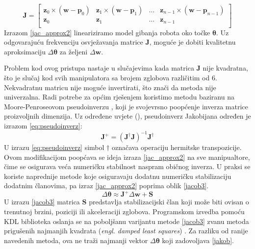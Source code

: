 \documentclass[times, utf8, diplomski, numeric]{fer}
\begin{document}
\begin{equation}
\mathbf{J} =
\begin{bmatrix}
\mathbf{z}_{0} \times (\mathbf{w} - \mathbf{p}_{0}) &\mathbf{z}_{1} \times (\mathbf{w} - \mathbf{p}_{1}) &\ldots &\mathbf{z}_{n-1} \times (\mathbf{w} - \mathbf{p}_{n-1})\\
\textbf{z}_{0} &\textbf{z}_{1} &\ldots &\textbf{z}_{n-1}\\
\end{bmatrix}
\label{jacob2}
\end{equation}
Izrazom \ref{jac_approx2} lineariziramo model gibanja robota oko točke $\bm{\theta}$. 
Uz odgovarajuću frekvenciju osvježavanja matrice $\mathbf{J}$, moguće je dobiti kvalitetnu aproksimaciju $\Delta \bm{\theta}$ za željeni $\Delta \mathbf{w}$.

Problem kod ovog pristupa nastaje u slučajevima kada matrica $\mathbf{J}$ nije kvadratna, što je slučaj kod svih manipulatora sa brojem zglobova različitim od 6.
Nekvadratnu matricu nije moguće invertirati, što znači da metoda nije univerzalna.
Radi potrebe za općim rješenjem koristimo metodu baziranu na Moore-Penroseovom pseudoinverzu \cite{klein1983review}, koji je svojevrsno poopćenje inverza matrice proizvoljnih dimenzija.
Uz određene uvjete (\cite{ben2003generalized}), pseudoinverz Jakobijana određen je izrazom \ref{eq:pseudoinverz}:
\begin{equation}
\mathbf{J}^{+} = \left( \mathbf{J}^{\dagger} \mathbf{J}\right)^{-1}\mathbf{J}^{\dagger}
\label{eq:pseudoinverz}
\end{equation}
U izrazu \ref{eq:pseudoinverz} simbol $\dagger$ označava operaciju hermitske transpozicije.
Ovom modifikacijom poopćava se ideja izraza \ref{jac_approx2} na sve manipualtore, čime se osigurava veća numeričku stabilnost naspram običnog inverza.
U praksi se koriste naprednije metode koje osiguravaju dodatnu numeričku stabilizaciju dodatnim članovima, pa izraz \ref{jac_approx2} poprima oblik \ref{jacob3}.
\begin{equation}
\Delta \bm{\theta} \approx \mathbf{J}^{+} \Delta \textbf{w} + \mathbf{S}
\label{jacob3}
\end{equation}
U izrazu \ref{jacob3} matrica $\mathbf{S}$ predstavlja stabilizacijski član koji može biti ovisan o trenutnoj brzini, poziciji ili akceleraciji zglobova.
Programskom izvedba pomoću KDL biblioteka oslanja se na poboljšanu varijantu metode \ref{jacob3} zvanu metoda prigušenih najmanjih kvadrata (\textit{engl. damped least squares}) \cite{buss2005selectively}.
Za razliku od ranije navedenih metoda, ova ne traži najmanji vektor $\Delta \bm{\theta}$ koji zadovoljava \ref{jakob}.
\end{document}
